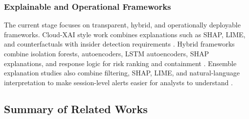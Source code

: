 \subsubsection{Explainable and Operational Frameworks}
The current stage focuses on transparent, hybrid, and operationally deployable frameworks. Cloud-XAI style work combines explanations such as SHAP, LIME, and counterfactuals with insider detection requirements \cite{cloudxai2025}. Hybrid frameworks combine isolation forests, autoencoders, LSTM autoencoders, SHAP explanations, and response logic for risk ranking and containment \cite{aibitd2026}. Ensemble explanation studies also combine filtering, SHAP, LIME, and natural-language interpretation to make session-level alerts easier for analysts to understand \cite{illuminating2026}.

\subsection{Summary of Related Works}
